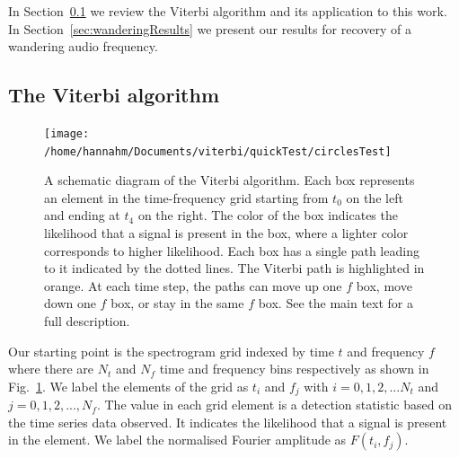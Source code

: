 \documentclass[paper-main.tex]{subfiles}
\begin{document}
In Section~\ref{sec:viterbi} we review the Viterbi algorithm and its application to this work. 
In Section~\ref{sec:wanderingResults} we present our results for recovery of a wandering audio frequency. 





\subsection{The Viterbi algorithm}
\label{sec:viterbi}

\begin{figure}
\texttt{[image: /home/hannahm/Documents/viterbi/quickTest/circlesTest]}
\caption{\label{fig:viterbi}
A schematic diagram of the Viterbi algorithm. 
Each box represents an element in the time-frequency grid starting from $t_0$ on the left and ending at $t_4$ on the right. 
The color of the box indicates the likelihood that a signal is present in the box, where a lighter color corresponds to higher likelihood. 
Each box has a single path leading to it indicated by the dotted lines. 
The Viterbi path is highlighted in orange. 
At each time step, the paths can move up one $f$ box, move down one $f$ box, or stay in the same $f$ box. 
See the main text for a full description. 
}
\end{figure}

Our starting point is the spectrogram grid indexed by time $t$ and frequency $f$ where there are $N_t$ and $N_f$ time and frequency bins respectively as shown in Fig.~\ref{fig:viterbi}.
We label the elements of the grid as $t_i$ and $f_j$ with $i=0,1,2,...N_t$ and $j=0,1,2,...,N_f$. 
The value in each grid element is a detection statistic based on the time series data observed. 
It indicates the likelihood that a signal is present in the element. 
We label the normalised Fourier amplitude as $F(t_i,f_j)$. 
\end{document}
